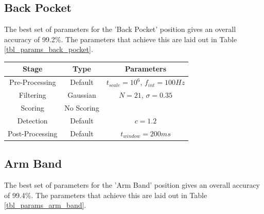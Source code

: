             \subsection{Back Pocket}

                The best set of parameters for the 'Back Pocket' position gives an overall accuracy of 99.2\%. The parameters that achieve this are laid out in Table \ref{tbl_params_back_pocket}.

                \begin{center}
                    \label{tbl_params_back_pocket}
                    \begin{tabular}{|c|c|c|}
                        \hline
                        Stage & Type & Parameters \\
                        \hline
                        Pre-Processing & Default & $t_{scale}=10^6$, $f_{int}=100Hz$ \\
                        Filtering & Gaussian & $N=21$, $\sigma=0.35$ \\
                        Scoring & No Scoring & \\
                        Detection & Default & $c=1.2$ \\
                        Post-Processing & Default & $t_{window}=200ms$ \\
                        \hline
                    \end{tabular}
                \end{center}

            \subsection{Arm Band}

                The best set of parameters for the 'Arm Band' position gives an overall accuracy of 99.4\%. The parameters that achieve this are laid out in Table \ref{tbl_params_arm_band}.

